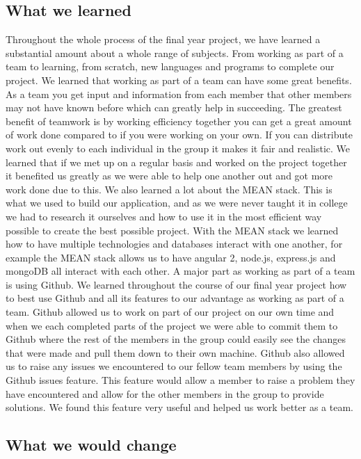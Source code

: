\subsection{What we learned}
Throughout the whole process of the final year project, we have learned a substantial amount about a whole range of subjects. From working as part of a team to learning, from scratch, new languages and programs to complete our project. We learned that working as part of a team can have some great benefits. As a team you get input and information from each member that other members may not have known before which can greatly help in succeeding. The greatest benefit of teamwork is by working efficiency together you can get a great amount of work done compared to if you were working on your own. If you can distribute work out evenly to each individual in the group it makes it fair and realistic. We learned that if we met up on a regular basis and worked on the project together it benefited us greatly as we were able to help one another out and got more work done due to this. We also learned a lot about the MEAN stack. This is what we used to build our application, and as we were never taught it in college we had to research it ourselves and how to use it in the most efficient way possible to create the best possible project. With the MEAN stack we learned how to have multiple technologies and databases interact with one another, for example the MEAN stack allows us to have angular 2, node.js, express.js and mongoDB all interact with each other. A major part as working as part of a team is using Github. We learned throughout the course of our final year project how to best use Github and all its features to our advantage as working as part of a team. Github allowed us to work on part of our project on our own time and when we each completed parts of the project we were able to commit them to Github where the rest of the members in the group could easily see the changes that were made and pull them down to their own machine. Github also allowed us to raise any issues we encountered to our fellow team members by using the Github issues feature. This feature would allow a member to raise a problem they have encountered and allow for the other members in the group to provide solutions. We found this feature very useful and helped us work better as a team. 

\subsection{What we would change}


